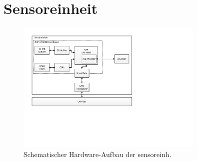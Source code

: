 \section{Sensoreinheit}

\begin{figure}
	\centering
		\includegraphics[width=0.8\textwidth]{images/visio/hardware_sensor.pdf}
	\caption{Schematischer Hardware-Aufbau der \gls{sensoreinh}.}
	\label{fig.hw_sensor}
\end{figure}


